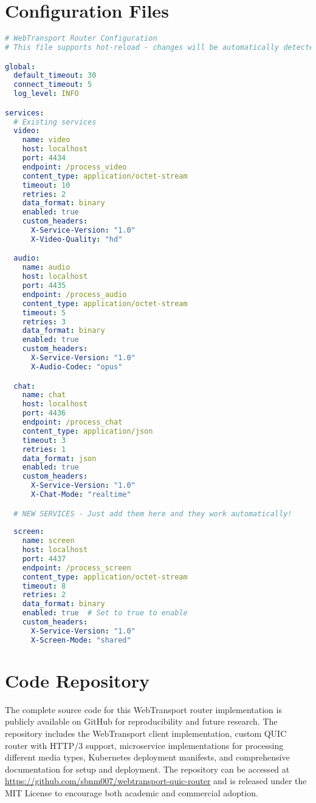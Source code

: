 \section{Configuration Files}

\begin{lstlisting}[breaklines=true, caption={Router Configuration File}, language=yaml]
# WebTransport Router Configuration
# This file supports hot-reload - changes will be automatically detected

global:
  default_timeout: 30
  connect_timeout: 5
  log_level: INFO

services:
  # Existing services
  video:
    name: video
    host: localhost
    port: 4434
    endpoint: /process_video
    content_type: application/octet-stream
    timeout: 10
    retries: 2
    data_format: binary
    enabled: true
    custom_headers:
      X-Service-Version: "1.0"
      X-Video-Quality: "hd"

  audio:
    name: audio
    host: localhost
    port: 4435
    endpoint: /process_audio
    content_type: application/octet-stream
    timeout: 5
    retries: 3
    data_format: binary
    enabled: true
    custom_headers:
      X-Service-Version: "1.0"
      X-Audio-Codec: "opus"

  chat:
    name: chat
    host: localhost
    port: 4436
    endpoint: /process_chat
    content_type: application/json
    timeout: 3
    retries: 1
    data_format: json
    enabled: true
    custom_headers:
      X-Service-Version: "1.0"
      X-Chat-Mode: "realtime"

  # NEW SERVICES - Just add them here and they work automatically!
  
  screen:
    name: screen
    host: localhost
    port: 4437
    endpoint: /process_screen
    content_type: application/octet-stream
    timeout: 8
    retries: 2
    data_format: binary
    enabled: true  # Set to true to enable  
    custom_headers:
      X-Service-Version: "1.0"
      X-Screen-Mode: "shared"
\end{lstlisting}

\section{Code Repository}
The complete source code for this WebTransport router implementation is publicly available on GitHub for reproducibility and future research. The repository includes the WebTransport client implementation, custom QUIC router with HTTP/3 support, microservice implementations for processing different media types, Kubernetes deployment manifests, and comprehensive documentation for setup and deployment. The repository can be accessed at \url{https://github.com/sbnm007/webtransport-quic-router} and is released under the MIT License to encourage both academic and commercial adoption.


